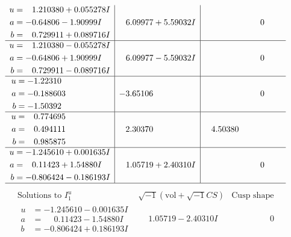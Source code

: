 \documentclass[1p]{elsarticle_modified}
\theoremstyle{definition}
\newcommand{\I}{\sqrt{-1}}
\begin{document}
$$\begin{array}{c|c|c}
\begin{aligned}
u &= \phantom{-}1.210380 + 0.055278 I \\
a &= -0.64806 - 1.90999 I \\
b &= \phantom{-}0.729911 + 0.089716 I\end{aligned}
 & \phantom{-}6.09977 + 5.59032 I & \phantom{-0.000000 } 0 \\ \hline\begin{aligned}
u &= \phantom{-}1.210380 - 0.055278 I \\
a &= -0.64806 + 1.90999 I \\
b &= \phantom{-}0.729911 - 0.089716 I\end{aligned}
 & \phantom{-}6.09977 - 5.59032 I & \phantom{-0.000000 } 0 \\ \hline\begin{aligned}
u &= -1.22310\phantom{ +0.000000I} \\
a &= -0.188603\phantom{ +0.000000I} \\
b &= -1.50392\phantom{ +0.000000I}\end{aligned}
 & -3.65106\phantom{ +0.000000I} & \phantom{-0.000000 } 0 \\ \hline\begin{aligned}
u &= \phantom{-}0.774695\phantom{ +0.000000I} \\
a &= \phantom{-}0.494111\phantom{ +0.000000I} \\
b &= \phantom{-}0.985875\phantom{ +0.000000I}\end{aligned}
 & \phantom{-}2.30370\phantom{ +0.000000I} & \phantom{-}4.50380\phantom{ +0.000000I} \\ \hline\begin{aligned}
u &= -1.245610 + 0.001635 I \\
a &= \phantom{-}0.11423 + 1.54880 I \\
b &= -0.806424 - 0.186193 I\end{aligned}
 & \phantom{-}1.05719 + 2.40310 I & \phantom{-0.000000 } 0\\
 \hline 
 \end{array}$$\newpage$$\begin{array}{c|c|c}  
\text{Solutions to }I^u_{1}& \I (\text{vol} + \sqrt{-1}CS) & \text{Cusp shape}\\
 \hline 
\begin{aligned}
u &= -1.245610 - 0.001635 I \\
a &= \phantom{-}0.11423 - 1.54880 I \\
b &= -0.806424 + 0.186193 I\end{aligned}
 & \phantom{-}1.05719 - 2.40310 I & \phantom{-0.000000 } 0 \\ \hline\begin{aligned}

\end{aligned}
\end{array}$$
\end{document}
